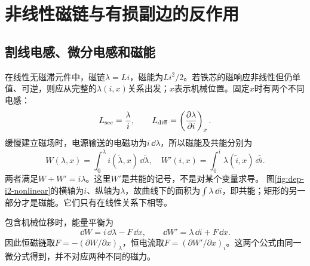 \section{非线性磁链与有损副边的反作用}
\subsection{割线电感、微分电感和磁能}
在线性无磁滞元件中，磁链$\lambda=Li$，磁能为$Li^2/2$。若铁芯的磁响应非线性但仍单值、可逆，则应从完整的$\lambda(i,x)$关系出发；$x$表示机械位置。固定$x$时有两个不同电感：
\[
 L_{\rm sec}=\frac{\lambda}{i},\qquad
 L_{\rm diff}=\left(\frac{\partial\lambda}{\partial i}\right)_x.
\]
缓慢建立磁场时，电源输送的电磁功为$i\,\dd\lambda$，所以磁能及共能分别为
\[
 W(\lambda,x)=\int_0^\lambda i(\tilde\lambda,x)\,\dd\tilde\lambda,
 \quad
 W'(i,x)=\int_0^i\lambda(\tilde i,x)\,\dd\tilde i.
\]
两者满足$W+W'=i\lambda$。这里$W'$是共能的记号，不是对某个变量求导。
图\ref{fig:dep-i2-nonlinear}的横轴为$i$、纵轴为$\lambda$，故曲线下的面积为$\int\lambda\,\dd i$，即共能；矩形的另一部分才是磁能。它们只有在线性关系下相等。

包含机械位移时，能量平衡为
\[
 \dd W=i\,\dd\lambda-F\,\dd x,\qquad
 \dd W'=\lambda\,\dd i+F\,\dd x.
\]
因此恒磁链取$F=-(\partial W/\partial x)_\lambda$，恒电流取$F=(\partial W'/\partial x)_i$。这两个公式由同一微分式得到，并不对应两种不同的磁力。

